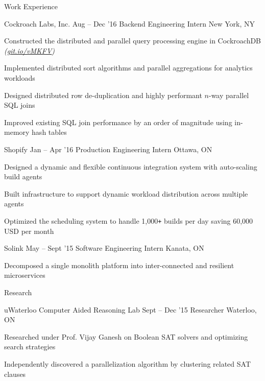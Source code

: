 \documentclass{resume} %
\begin{document}
\begin{rSection}{Work Experience}
  \begin{rSubsection}{Cockroach Labs, Inc.}
                     {Aug -- Dec '16}
                     {Backend Engineering Intern}
                     {New York, NY}

    \item Constructed the distributed and parallel query processing engine in
      CockroachDB {\em (\href{https://git.io/vMKFV}{git.io/vMKFV})}
    \item Implemented distributed sort algorithms and parallel aggregations for
      analytics workloads
    \item Designed distributed row de-duplication and highly performant $n$-way
      parallel SQL joins
    \item Improved existing SQL join performance by an order of magnitude
      using in-memory hash tables
  \end{rSubsection}

  \begin{rSubsection}{Shopify}
                     {Jan -- Apr '16}
                     {Production Engineering Intern}
                     {Ottawa, ON}

  \item Designed a dynamic and flexible continuous integration system with
    auto-scaling build agents
  \item Built infrastructure to support dynamic workload distribution across
    multiple agents
  \item Optimized the scheduling system to handle 1,000\texttt{+} builds per
    day saving 60,000 USD per month
  \end{rSubsection}

  \begin{rSubsection}{Solink}
                     {May -- Sept '15}
                     {Software Engineering Intern}
                     {Kanata, ON}

    \item Decomposed a single monolith platform into inter-connected and resilient
      microservices
  \end{rSubsection}
\end{rSection}


\begin{rSection}{Research}
  \begin{rSubsection}{uWaterloo Computer Aided Reasoning Lab}
                     {Sept -- Dec '15}
                     {Researcher}
                     {Waterloo, ON}
    \item Researched under Prof. Vijay Ganesh on Boolean SAT solvers and optimizing
      search strategies
    \item Independently discovered a parallelization algorithm by clustering
      related SAT clauses
  \end{rSubsection}
\end{rSection}
\end{document}
